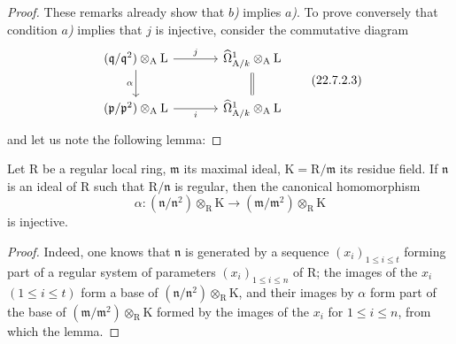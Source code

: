 \begin{proof}
These remarks already show that \emph{$b$)} implies \emph{$a$)}.
To prove conversely that condition \emph{$a$)} implies that $j$ is injective, consider the commutative diagram
\begin{equation}
\label{0.22.7.2.3}
\begin{tikzcd}[column sep=large]
  (\mathfrak{q}/\mathfrak{q}^2)\otimes_\mathrm{A}\mathrm{L} \ar[r,"j"] \ar[d,"\alpha"'] & \widehat{\Omega}^1_{\mathrm{A}/k}\otimes_\mathrm{A}\mathrm{L} \ar[d,equal] \\
  (\mathfrak{p}/\mathfrak{p}^2)\otimes_\mathrm{A}\mathrm{L} \ar[r,"i"'] & \widehat{\Omega}^1_{\mathrm{A}/k}\otimes_\mathrm{A}\mathrm{L}
\end{tikzcd}
\tag{22.7.2.3}
\end{equation}
and let us note the following lemma:
\end{proof}

\begin{lemma}[22.7.2.4]
\label{0.22.7.2.4}
Let $\mathrm{R}$ be a regular local ring, $\mathfrak{m}$ its maximal ideal, $\mathrm{K}=\mathrm{R}/\mathfrak{m}$ its residue field.
If $\mathfrak{n}$ is an ideal of $\mathrm{R}$ such that $\mathrm{R}/\mathfrak{n}$ is regular, then the canonical homomorphism
\[
\label{0.22.7.2.5}
  \alpha:(\mathfrak{n}/\mathfrak{n}^2)\otimes_\mathrm{R}\mathrm{K}\to(\mathfrak{m}/\mathfrak{m}^2)\otimes_\mathrm{R}\mathrm{K}
  \tag{22.7.2.5}
\]
is injective.
\end{lemma}

\begin{proof}
Indeed, one knows  that $\mathfrak{n}$ is generated by a sequence $(x_i)_{1\leq i\leq t}$ forming part of a regular system of parameters $(x_i)_{1\leq i\leq n}$ of $\mathrm{R}$; the images of the $x_i$ $(1\leq i\leq t)$ form a base of $(\mathfrak{n}/\mathfrak{n}^2)\otimes_\mathrm{R}\mathrm{K}$, and their images by $\alpha$ form part of the base of $(\mathfrak{m}/\mathfrak{m}^2)\otimes_\mathrm{R}\mathrm{K}$ formed by the images of the $x_i$ for $1\leq i\leq n$, from which the lemma.
\end{proof}

